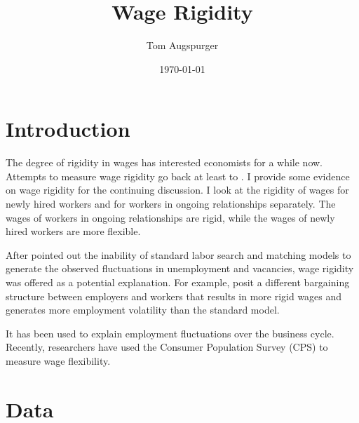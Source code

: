 \documentclass[11pt]{article}
\title{Wage Rigidity}
\author{Tom Augspurger}
\date{\today}
\begin{document}
\maketitle




\section{Introduction}
\label{sec:intro}

The degree of rigidity in wages has interested economists for a while now.
Attempts to measure wage rigidity go back at least to \cite{dunlop_1938}.
I provide some evidence on wage rigidity for the continuing discussion.
I look at the rigidity of wages for newly hired workers and for workers in ongoing relationships separately.
The wages of workers in ongoing relationships are rigid, while the wages of newly hired workers are more flexible.

After \cite{shimer_2005} pointed out the inability of standard labor search and matching models to generate the observed fluctuations in unemployment and vacancies, wage rigidity was offered as a potential explanation.
For example, \cite{hall_milgrom_2008} posit a different bargaining structure between employers and workers that results in more rigid wages and generates more employment volatility than the standard model.

It has been used to explain employment fluctuations over the business cycle.
Recently, researchers have used the Consumer Population Survey (CPS) to measure wage flexibility.


\section{Data}
\label{sec:data}
\end{document}
